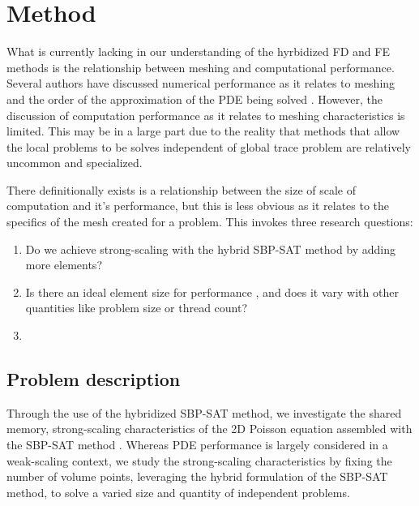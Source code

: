 
\section{Method} %

What is currently lacking in our understanding of the hyrbidized FD and 
FE methods is the relationship between meshing and computational performance. Several authors have discussed numerical performance as it relates to meshing and
the order of the approximation of the PDE being solved \citep{}. However, the discussion of computation performance as it relates to meshing characteristics is limited. This may be in a large part due to the reality that methods that allow the local problems to be solves independent of global trace problem are relatively 
uncommon and specialized. 

There definitionally exists is a relationship between the size of scale of computation and it's performance, but this is less obvious as it relates
to the specifics of the mesh created for a problem. This invokes three research questions:

\begin{enumerate}[label=\textbf{\footnotesize RQ\arabic*.}]
	\item {Do we achieve strong-scaling with the hybrid \mbox{SBP-SAT} 
		   method by adding more elements?}
	\item {Is there an ideal element size for performance , and does it 
		   vary with other quantities like problem size or thread count?}
	\item {}
\end{enumerate}

\subsection{Problem description} %

Through the use of the hybridized SBP-SAT method, we investigate 
the shared memory, strong-scaling characteristics of the 2D Poisson 
equation assembled with the SBP-SAT method \citep{kozdon2021hybridized}. 
Whereas PDE performance is largely considered in a weak-scaling context,
we study the strong-scaling characteristics by fixing the number of 
volume points, leveraging the hybrid formulation of the SBP-SAT method, 
to solve a varied size and quantity of independent problems.

